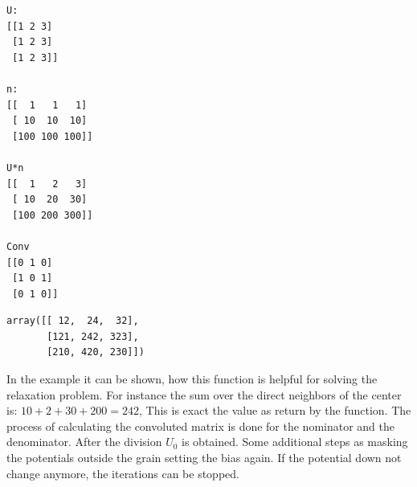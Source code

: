 \documentclass[11pt]{article}
\makeatletter
\newcommand{\boxspacing}{\kern\kvtcb@left@rule\kern\kvtcb@boxsep}
\newcommand{\prompt}[4]{
        \ttfamily\llap{{\color{#2}[#3]:\hspace{3pt}#4}}\vspace{-\baselineskip}
    }
\makeatother
\begin{document}
    \begin{Verbatim}[commandchars=\\\{\}]
U:
[[1 2 3]
 [1 2 3]
 [1 2 3]]

n:
[[  1   1   1]
 [ 10  10  10]
 [100 100 100]]

U*n
[[  1   2   3]
 [ 10  20  30]
 [100 200 300]]

Conv
[[0 1 0]
 [1 0 1]
 [0 1 0]]

    \end{Verbatim}

            \begin{tcolorbox}[breakable, size=fbox, boxrule=.5pt, pad at break*=1mm, opacityfill=0]
\prompt{Out}{outcolor}{196}{\boxspacing}
\begin{Verbatim}[commandchars=\\\{\}]
array([[ 12,  24,  32],
       [121, 242, 323],
       [210, 420, 230]])
\end{Verbatim}
\end{tcolorbox}
        
    In the example it can be shown, how this function is helpful for solving
the relaxation problem. For instance the sum over the direct neighbors
of the center is: \(10+2+30+200=242\), This is exact the value as return
by the function. The process of calculating the convoluted matrix is
done for the nominator and the denominator. After the division \(U_0\)
is obtained. Some additional steps as masking the potentials outside the
grain setting the bias again. If the potential down not change anymore,
the iterations can be stopped.
\end{document}
